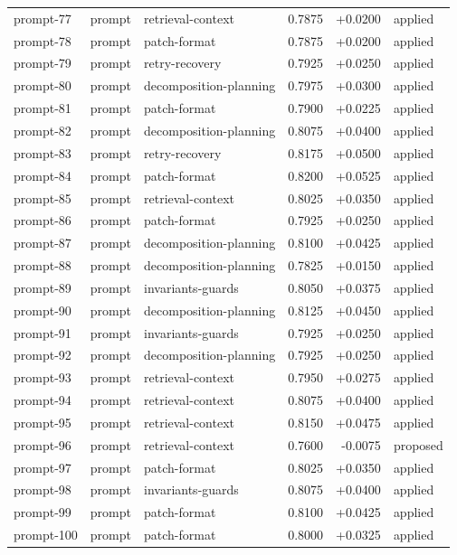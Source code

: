 \begin{center}
\begin{longtable}{llp{5.2cm}rrl}
prompt-77 & prompt & retrieval-context & 0.7875 & +0.0200 & applied \\
prompt-78 & prompt & patch-format & 0.7875 & +0.0200 & applied \\
prompt-79 & prompt & retry-recovery & 0.7925 & +0.0250 & applied \\
prompt-80 & prompt & decomposition-planning & 0.7975 & +0.0300 & applied \\
prompt-81 & prompt & patch-format & 0.7900 & +0.0225 & applied \\
prompt-82 & prompt & decomposition-planning & 0.8075 & +0.0400 & applied \\
prompt-83 & prompt & retry-recovery & 0.8175 & +0.0500 & applied \\
prompt-84 & prompt & patch-format & 0.8200 & +0.0525 & applied \\
prompt-85 & prompt & retrieval-context & 0.8025 & +0.0350 & applied \\
prompt-86 & prompt & patch-format & 0.7925 & +0.0250 & applied \\
prompt-87 & prompt & decomposition-planning & 0.8100 & +0.0425 & applied \\
prompt-88 & prompt & decomposition-planning & 0.7825 & +0.0150 & applied \\
prompt-89 & prompt & invariants-guards & 0.8050 & +0.0375 & applied \\
prompt-90 & prompt & decomposition-planning & 0.8125 & +0.0450 & applied \\
prompt-91 & prompt & invariants-guards & 0.7925 & +0.0250 & applied \\
prompt-92 & prompt & decomposition-planning & 0.7925 & +0.0250 & applied \\
prompt-93 & prompt & retrieval-context & 0.7950 & +0.0275 & applied \\
prompt-94 & prompt & retrieval-context & 0.8075 & +0.0400 & applied \\
prompt-95 & prompt & retrieval-context & 0.8150 & +0.0475 & applied \\
prompt-96 & prompt & retrieval-context & 0.7600 & -0.0075 & proposed \\
prompt-97 & prompt & patch-format & 0.8025 & +0.0350 & applied \\
prompt-98 & prompt & invariants-guards & 0.8075 & +0.0400 & applied \\
prompt-99 & prompt & patch-format & 0.8100 & +0.0425 & applied \\
prompt-100 & prompt & patch-format & 0.8000 & +0.0325 & applied \\
\bottomrule\end{longtable}\end{center}
\clearpage
